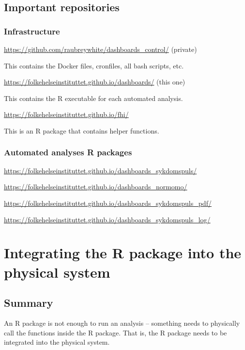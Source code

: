\documentclass[12pt,]{article}
\theoremstyle{definition}
\theoremstyle{definition}
\theoremstyle{definition}
\theoremstyle{remark}
\begin{document}
\subsection{Important repositories}\label{important-repositories}

\subsubsection{Infrastructure}\label{infrastructure}

\url{https://github.com/raubreywhite/dashboards_control/} (private)

This contains the Docker files, cronfiles, all bash scripts, etc.

\url{https://folkehelseinstituttet.github.io/dashboards/} (this one)

This contains the R executable for each automated analysis.

\url{https://folkehelseinstituttet.github.io/fhi/}

This is an R package that contains helper functions.

\subsubsection{Automated analyses R
packages}\label{automated-analyses-r-packages}

\url{https://folkehelseinstituttet.github.io/dashboards_sykdomspuls/}

\url{https://folkehelseinstituttet.github.io/dashboards_normomo/}

\url{https://folkehelseinstituttet.github.io/dashboards_sykdomspuls_pdf/}

\url{https://folkehelseinstituttet.github.io/dashboards_sykdomspuls_log/}

\section{Integrating the R package into the physical
system}\label{integrating-the-r-package-into-the-physical-system}

\subsection{Summary}\label{summary}

An R package is not enough to run an analysis -- something needs to
physically call the functions inside the R package. That is, the R
package needs to be integrated into the physical system.
\end{document}
